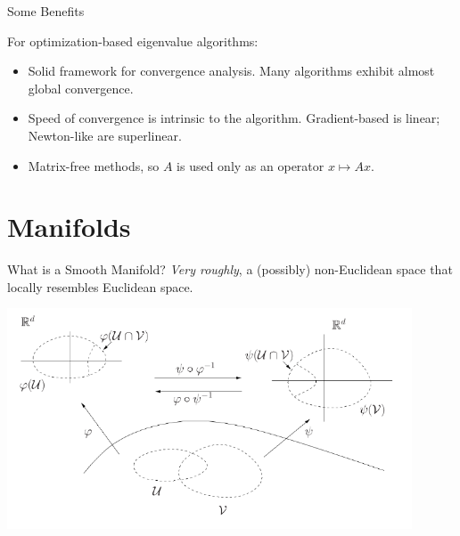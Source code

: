 \documentclass[xcolor=dvipsnames,t]{beamer} %
\newcommand{\reals}{\mathbb{R}}
\begin{document}


\begin{frame}{Some Benefits}
   
   For optimization-based eigenvalue algorithms:\\
   \begin{itemize}
      \item Solid framework for convergence analysis.  Many algorithms exhibit almost global convergence.
      \item Speed of convergence is intrinsic to the algorithm.  Gradient-based is linear; Newton-like are superlinear.
      \item Matrix-free methods, so $A$ is used only as an operator $x\mapsto Ax$.
   \end{itemize}
\end{frame}



\section{Manifolds}
   \begin{frame}{What is a Smooth Manifold?}
   \emph{Very roughly}, a (possibly) non-Euclidean space that locally resembles Euclidean space.\\[.5em]

   \begin{center}
      \includegraphics[width=0.9\textwidth]{figures/charts.pdf}
   \end{center}
\end{frame}
\end{document}

